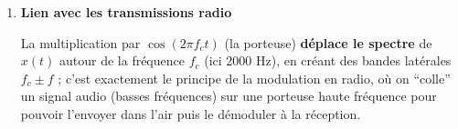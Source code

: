 \begin{enumerate}[label=(\alph*)]
On voit que le spectre initial (pics à 440 et 880 Hz) s’est transformé en \textbf{paires de bandes latérales} autour de 2000 Hz :
\[
2000 \pm 440,\quad 2000 \pm 880.
\]

\item \textbf{Lien avec les transmissions radio}

La multiplication par $\cos(2\pi f_c t)$ (la porteuse) \textbf{déplace le spectre} de $x(t)$ autour de la fréquence $f_c$ (ici 2000 Hz), en créant des bandes latérales $f_c \pm f$ ; c’est exactement le principe de la modulation en radio, où on “colle” un signal audio (basses fréquences) sur une porteuse haute fréquence pour pouvoir l’envoyer dans l’air puis le démoduler à la réception.

\end{enumerate}